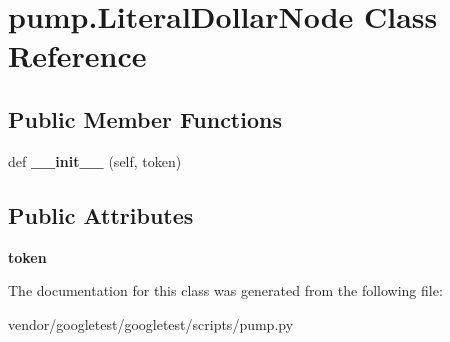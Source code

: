 \hypertarget{classpump_1_1_literal_dollar_node}{}\section{pump.\+Literal\+Dollar\+Node Class Reference}
\label{classpump_1_1_literal_dollar_node}
\subsection*{Public Member Functions}
\begin{DoxyCompactItemize}
\item 
\mbox{\label{classpump_1_1_literal_dollar_node_a181cccad8a48f7dfdd0716e427897e0b}} 
def {\bfseries \+\_\+\+\_\+init\+\_\+\+\_\+} (self, token)
\end{DoxyCompactItemize}
\subsection*{Public Attributes}
\begin{DoxyCompactItemize}
\item 
\mbox{\label{classpump_1_1_literal_dollar_node_ab4c6e209635b8868bcdf0fe8053431c6}} 
{\bfseries token}
\end{DoxyCompactItemize}


The documentation for this class was generated from the following file\+:\begin{DoxyCompactItemize}
\item 
vendor/googletest/googletest/scripts/pump.\+py\end{DoxyCompactItemize}

